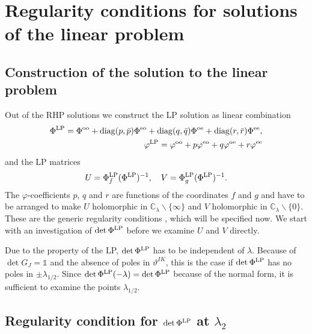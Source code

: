 \documentclass[12pt]{iopart}
\begin{document}
\section{Regularity conditions for solutions of the linear problem}

\subsection{Construction of the solution to the linear problem}

Out of the RHP solutions  we construct the LP solution as linear combination
\begin{eqnarray}
\Phi^{\rm LP}=\Phi^{\rm oo}+{\rm diag}(p,\bar{p})\Phi^{\rm eo}+{\rm diag}(q,\bar{q})\Phi^{\rm oe}+{\rm diag}(r,\bar{r})\Phi^{\rm ee}, \\
\varphi^{\rm LP}=\varphi^{\rm oo}+p\varphi^{\rm eo}+q\varphi^{\rm oe}+r\varphi^{\rm ee}
\end{eqnarray}
and the LP matrices 
\begin{equation}
U=\Phi^{\rm LP}_f(\Phi^{\rm LP})^{-1}, \quad V=\Phi^{\rm LP}_g(\Phi^{\rm LP})^{-1}. \label{LPMat}
\end{equation}
The $\varphi$-coefficients $p$, $q$ and $r$ are functions of the coordinates $f$ and $g$ and have to be arranged to make $U$ holomorphic in $\mathbb{C}_{\lambda}\backslash\{\infty\}$ and $ V$ holomorphic in $\mathbb{C}_{\lambda}\backslash\{0\}$.
These are the generic regularity conditions , which will be specified now. We start with an investigation of $\det\Phi^{\rm LP}$ before we examine $U$ and $V$ directly.


Due to the property  of the LP, $\det\Phi^{\rm LP}$ has to be independent of $\lambda$. Because of $\det G_J=\mathbb{1}$ and the absence of poles in $\vartheta^{IK}$, this is the case if $\det\Phi^{\rm LP}$ has no poles in $\pm\lambda_{1/2}$. Since $\det\Phi^{\rm LP}(-\lambda)=\det\Phi^{\rm LP}$ because of the normal form, it is sufficient to examine the points $\lambda_{1/2}$.

\subsection{Regularity condition for $\det \Phi^{\rm LP}$ at $\lambda_2$}
\end{document}
